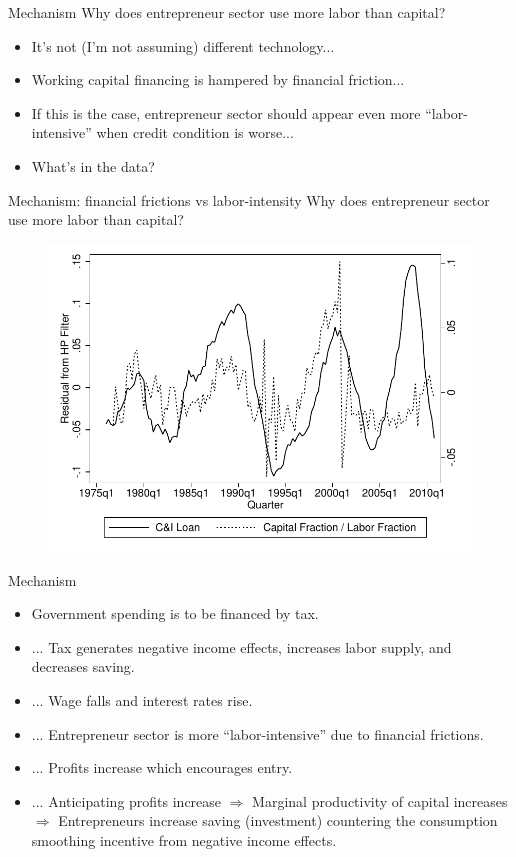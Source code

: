 \documentclass[svgnames]{beamer}
\begin{document}
\begin{frame}{Mechanism}
{Why does entrepreneur sector use more labor than capital?}
\begin{itemize}
\item It's not (I'm not assuming) different technology...
\item Working capital financing is hampered by financial friction...
\item If this is the case, entrepreneur sector should appear even more ``labor-intensive'' when credit condition is worse...
\item What's in the data?
\end{itemize} 
\end{frame}

\begin{frame}{Mechanism: financial frictions vs labor-intensity}
{Why does entrepreneur sector use more labor than capital?}
\begin{figure}[!ht]
\includegraphics[width=1\textwidth]{graph/loan_klratio.pdf}
\end{figure}
\end{frame}

\begin{frame}{Mechanism}
\begin{itemize}
\item Government spending is to be financed by tax.
\item ... Tax generates negative income effects, increases labor supply, and decreases saving.
\item ... Wage falls and interest rates rise.
\item ... Entrepreneur sector is more ``labor-intensive'' due to financial frictions.
\item ... Profits increase which encourages entry.
\item ... Anticipating profits increase $\Rightarrow$ Marginal productivity of capital increases $\Rightarrow$ Entrepreneurs increase saving (investment) countering the consumption smoothing incentive from negative income effects.
\end{itemize}
\end{frame}
\end{document}
